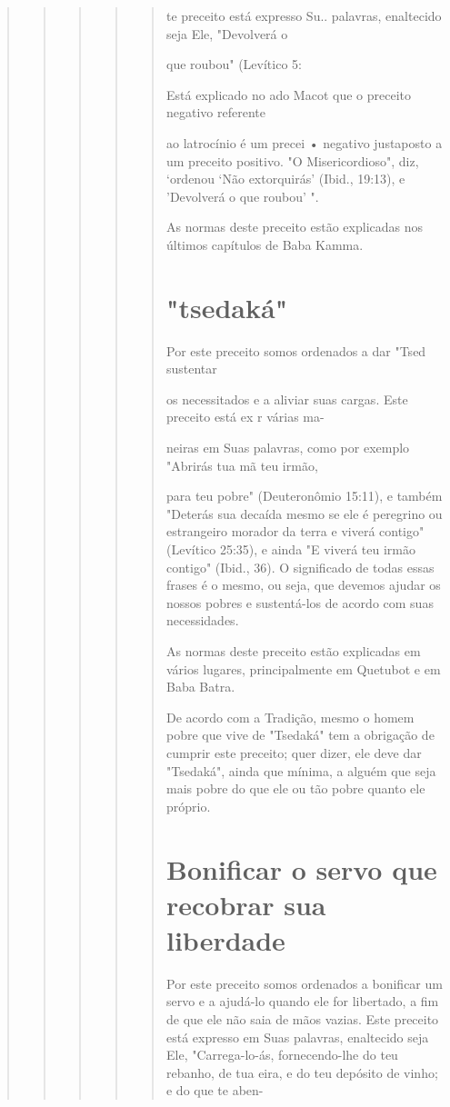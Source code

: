 \begin{quote}
\begin{quote}
\begin{quote}
\begin{quote}
\begin{quote}
te preceito está expresso Su.. palavras, enaltecido seja Ele, "Devolverá
o

que roubou" (Levítico 5:

Está explicado no ado Macot que o preceito negativo referente

ao latrocínio é um precei • negativo justaposto a um preceito positivo.
"O Mi­sericordioso", diz, `ordenou `Não extorquirás' (Ibid., 19:13), e
'Devolverá o que roubou' ".

As normas deste preceito estão explicadas nos últimos capítulos de Baba
Kamma.

\section{"tsedaká"}

Por este preceito somos ordenados a dar "Tsed sustentar

os necessitados e a aliviar suas cargas. Este preceito está ex r várias
ma-

neiras em Suas palavras, como por exemplo "Abrirás tua mã teu irmão,

para teu pobre" (Deuteronômio 15:11), e também "Deterás sua decaída
mes­mo se ele é peregrino ou estrangeiro morador da terra e viverá
contigo" (Leví­tico 25:35), e ainda "E viverá teu irmão contigo" (Ibid.,
36). O significado de todas essas frases é o mesmo, ou seja, que devemos
ajudar os nossos pobres e sustentá-los de acordo com suas necessidades.

As normas deste preceito estão explicadas em vários lugares,
princi­palmente em Quetubot e em Baba Batra.

De acordo com a Tradição, mesmo o homem pobre que vive de "Tse­daká" tem
a obrigação de cumprir este preceito; quer dizer, ele deve dar
"Tse­daká", ainda que mínima, a alguém que seja mais pobre do que ele ou
tão po­bre quanto ele próprio.

\section{Bonificar o servo que recobrar sua liberdade}

Por este preceito somos ordenados a bonificar um servo e a ajudá-lo
quando ele for libertado, a fim de que ele não saia de mãos vazias. Este
preceito está expresso em Suas palavras, enaltecido seja Ele,
"Carrega-lo-ás, fornecendo-lhe do teu rebanho, de tua eira, e do teu
depósito de vinho; e do que te aben-
\end{quote}


\end{quote}
\end{quote}
\end{quote}
\end{quote}
